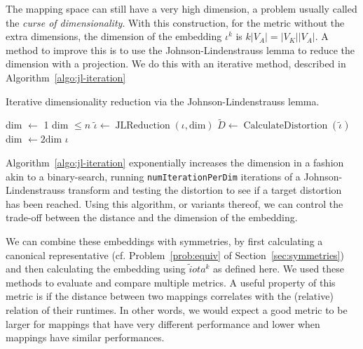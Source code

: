 The mapping space can still have a very high dimension, a problem usually called the \emph{curse of dimensionality}.
With this construction, for the metric without the extra dimensions, the dimension of the embedding $\iota^k$ is $k |V_A| = |V_K| |V_A|$.
A method to improve this is to use the Johnson-Lindenstrauss lemma to reduce the dimension with a projection.
We do this with an iterative method, described in Algorithm~\ref{algo:jl-iteration}

\begin{algorithm}
	\caption{Iterative dimensionality reduction via the Johnson-Lindenstrauss lemma.} 
	\label{algo:jl-iteration}
	\begin{algorithmic}[1]
	 \State dim $\leftarrow$ 1
	 \While dim $\leq n$
		       \State $\tilde \iota \leftarrow \operatorname{JLReduction}(\iota,\text{dim})$
			   \State $\tilde D \leftarrow \operatorname{CalculateDistortion}(\tilde \iota)$
			       \Return{$\tilde \iota$}
			   \EndIf
	   \EndFor 
	   \State dim $\leftarrow 2 \text{dim}$
   \EndWhile
   \Return $\iota$
	\end{algorithmic}
\end{algorithm}

Algorithm~\ref{algo:jl-iteration} exponentially increases the dimension in a fashion akin to a binary-search, running \texttt{numIterationPerDim} iterations of a Johnson-Lindenstrauss transform and testing the distortion to see if a target distortion has been reached.
Using this algorithm, or variants thereof, we can control the trade-off between the distance and the dimension of the embedding.

We can combine these embeddings with symmetries, by first calculating a canonical representative (cf. Problem~\ref{prob:equiv} of Section~\ref{sec:symmetries}) and then calculating the embedding using $\tilde iota^k$ as defined here.
We used these methods to evaluate and compare multiple metrics. 
A useful property of this metric is if the distance between two mappings correlates with the (relative) relation of their runtimes.
In other words, we would expect a good metric to be larger for mappings that have very different performance and lower when mappings have similar performances.

